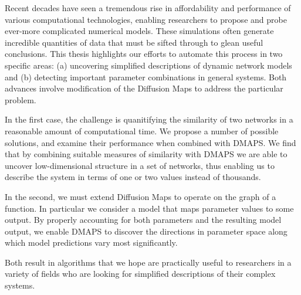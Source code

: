 
Recent decades have seen a tremendous rise in affordability and
performance of various computational technologies, enabling
researchers to propose and probe ever-more complicated numerical
models. These simulations often generate incredible quantities of data
that must be sifted through to glean useful conclusions. This thesis
highlights our efforts to automate this process in two specific areas:
(a) uncovering simplified descriptions of dynamic network models and
(b) detecting important parameter combinations in general
systems. Both advances involve modification of the Diffusion Maps to
address the particular problem.

In the first case, the challenge is quanitifying the similarity of two
networks in a reasonable amount of computational time. We propose a
number of possible solutions, and examine their performance when
combined with DMAPS. We find that by combining suitable measures of
similarity with DMAPS we are able to uncover low-dimensional structure
in a set of networks, thus enabling us to describe the system in terms
of one or two values instead of thousands.

In the second, we must extend Diffusion Maps to operate on the graph
of a function. In particular we consider a model that maps parameter
values to some output. By properly accounting for both parameters and
the resulting model output, we enable DMAPS to discover the directions
in parameter space along which model predictions vary most
significantly.

Both result in algorithms that we hope are practically useful to
researchers in a variety of fields who are looking for simplified
descriptions of their complex systems.

